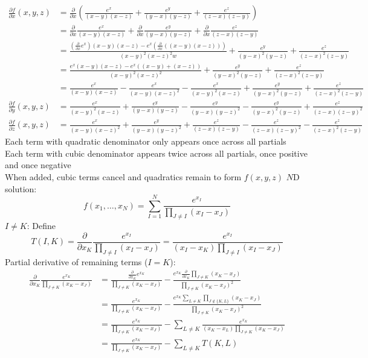 \documentclass{article}
\begin{document}
\begin{align*}
  \frac{\partial f}{\partial x}(x, y, z)
  &= \frac{\partial}{\partial x}\left(\frac{e^x}{(x-y)(x-z)}+\frac{e^y}{(y-x)(y-z)}+\frac{e^z}{(z-x)(z-y)}\right) \\
  &= \frac{\partial}{\partial x}\frac{e^x}{(x-y)(x-z)}+\frac{\partial}{\partial x}\frac{e^y}{(y-x)(y-z)}+\frac{\partial}{\partial x}\frac{e^z}{(z-x)(z-y)} \\
  &= \frac{\left(\frac{\partial}{\partial x}e^x\right)(x-y)(x-z)-e^x\left(\frac{\partial}{\partial x}((x-y)(x-z))\right)}{(x-y)^2(x-z)^2w}+\frac{e^y}{(y-x)^2(y-z)}+\frac{e^z}{(z-x)^2(z-y)} \\
  &= \frac{e^x(x-y)(x-z)-e^x((x-y)+(x-z))}{(x-y)^2(x-z)^2}+\frac{e^y}{(y-x)^2(y-z)}+\frac{e^z}{(z-x)^2(z-y)} \\
  &= \frac{e^x}{(x-y)(x-z)}-\frac{e^x}{(x-y)(x-z)^2}-\frac{e^x}{(x-y)^2(x-z)}+\frac{e^y}{(y-x)^2(y-z)}+\frac{e^z}{(z-x)^2(z-y)} \\
  \frac{\partial f}{\partial y}(x, y, z)
  &= \frac{e^x}{(x-y)^2(x-z)}+\frac{e^y}{(y-x)(y-z)}-\frac{e^y}{(y-x)(y-z)^2}-\frac{e^y}{(y-x)^2(y-z)}+\frac{e^z}{(z-x)(z-y)^2} \\
  \frac{\partial f}{\partial z}(x, y, z)
  &= \frac{e^x}{(x-y)(x-z)^2}+\frac{e^y}{(y-x)(y-z)^2}+\frac{e^z}{(z-x)(z-y)}-\frac{e^z}{(z-x)(z-y)^2}-\frac{e^z}{(z-x)^2(z-y)}
\end{align*}
Each term with quadratic denominator only appears once across all partials \\
Each term with cubic denominator appears twice across all partials,
once positive and once negative \\
When added, cubic terms cancel and quadratics remain to form $f(x, y, z)$
\newpage
$N$D solution:
\[
f(x_1, \ldots, x_N) =
\sum_{I=1}^N\frac{e^{x_I}}{\prod\limits_{J \neq I}(x_I-x_J)}
\]
$I \neq K$: Define
\[T(I, K) = \frac{\partial}{\partial x_K} \frac{e^{x_I}}{\prod\limits_{J \neq I}(x_I-x_J)}
= \frac{e^{x_I}}{(x_I-x_K)\prod\limits_{J \neq I}(x_I-x_J)}\]
Partial derivative of remaining terms ($I=K$):
\begin{align*}
  \frac{\partial}{\partial x_K} \frac{e^{x_K}}{\prod\limits_{J \neq K}(x_K-x_J)}
  &= \frac{\frac{\partial}{\partial x_K}e^{x_K}}{\prod\limits_{J \neq K}(x_K-x_J)}-\frac{e^{x_K}\frac{\partial}{\partial x_K}\prod\limits_{J \neq K}(x_K-x_J)}{\prod\limits_{J \neq K}(x_K-x_J)^2} \\
  &= \frac{e^{x_K}}{\prod\limits_{J \neq K}(x_K-x_J)}-\frac{e^{x_K}\sum\limits_{L \neq K}\prod\limits_{J \not\in \{K, L\}}(x_K-x_J)}{\prod\limits_{J \neq K}(x_K-x_J)^2} \\
  &= \frac{e^{x_K}}{\prod\limits_{J \neq K}(x_K-x_J)}-\sum_{L \neq K}\frac{e^{x_K}}{(x_K-x_L)\prod\limits_{J \neq K}(x_K-x_J)} \\
  &= \frac{e^{x_K}}{\prod\limits_{J \neq K}(x_K-x_J)}-\sum_{L \neq K}T(K, L)
\end{align*}
\end{document}
